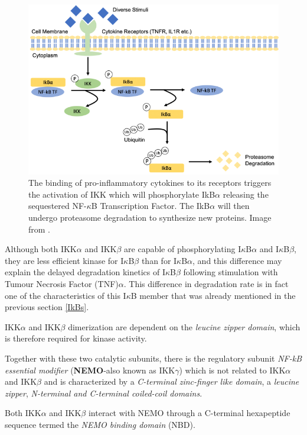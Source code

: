 \documentclass[12pt,a4paper]{report}
\begin{document}
\begin{figure}[!ht]
\includegraphics[scale=0.70]{NFkBactivation.png}
\caption{The binding of pro-inflammatory cytokines to its receptors triggers the activation of IKK which will phosphorylate IkB$\alpha$ releasing the sequestered NF-$\kappa$B Transcription Factor. The IkB$\alpha$ will then undergo proteasome degradation to synthesize new proteins. Image from \cite{Project}.}
\label{NFkBactivation}
\end{figure}

Although both IKK$\alpha$ and IKK$\beta$ are capable of phosphorylating I$\kappa$B$\alpha$ and I$\kappa$B$\beta$, they are less efficient kinase for
I$\kappa$B$\beta$ than for I$\kappa$B$\alpha$, and this difference may explain the delayed degradation kinetics of
I$\kappa$B$\beta$ following stimulation with Tumour Necrosis Factor (TNF)$\alpha$. This difference in degradation rate is in fact one of the characteristics of this I$\kappa$B member that was already mentioned in the previous section \ref{IkBs}.

IKK$\alpha$ and IKK$\beta$ dimerization are dependent on the \emph{leucine zipper domain}, which is therefore required for kinase activity.

Together with these two catalytic subunits, there is the regulatory
subunit \emph{NF-kB essential modifier} (\textbf{NEMO}-also known as IKK$\gamma$) which is not related to
IKK$\alpha$ and IKK$\beta$ and is characterized by a \emph{C-terminal zinc-finger like domain}, a \emph{leucine
zipper}, \emph{N-terminal and C-terminal coiled-coil domains}.

Both IKK$\alpha$ and IKK$\beta$ interact with NEMO through a C-terminal hexapeptide sequence termed the \emph{NEMO binding domain} (NBD).
\end{document}
